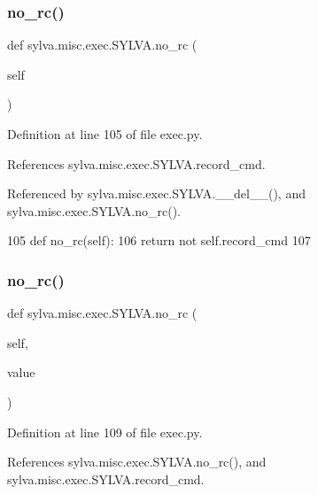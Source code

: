 \subsubsection{\texorpdfstring{no\+\_\+rc()}{no\_rc()}\hspace{0.1cm}{\footnotesize\ttfamily [1/2]}}
{\footnotesize\ttfamily def sylva.\+misc.\+exec.\+S\+Y\+L\+V\+A.\+no\+\_\+rc (\begin{DoxyParamCaption}\item[{}]{self }\end{DoxyParamCaption})}



Definition at line 105 of file exec.\+py.



References sylva.\+misc.\+exec.\+S\+Y\+L\+V\+A.\+record\+\_\+cmd.



Referenced by sylva.\+misc.\+exec.\+S\+Y\+L\+V\+A.\+\_\+\+\_\+del\+\_\+\+\_\+(), and sylva.\+misc.\+exec.\+S\+Y\+L\+V\+A.\+no\+\_\+rc().


\begin{DoxyCode}
105   \textcolor{keyword}{def }no\_rc(self):
106     \textcolor{keywordflow}{return} \textcolor{keywordflow}{not} self.record\_cmd
107 
\end{DoxyCode}
\mbox{\label{classsylva_1_1misc_1_1exec_1_1_s_y_l_v_a_a9e269e725cc5f5211d886a5b9608a089}} 
\subsubsection{\texorpdfstring{no\+\_\+rc()}{no\_rc()}\hspace{0.1cm}{\footnotesize\ttfamily [2/2]}}
{\footnotesize\ttfamily def sylva.\+misc.\+exec.\+S\+Y\+L\+V\+A.\+no\+\_\+rc (\begin{DoxyParamCaption}\item[{}]{self,  }\item[{}]{value }\end{DoxyParamCaption})}



Definition at line 109 of file exec.\+py.



References sylva.\+misc.\+exec.\+S\+Y\+L\+V\+A.\+no\+\_\+rc(), and sylva.\+misc.\+exec.\+S\+Y\+L\+V\+A.\+record\+\_\+cmd.


